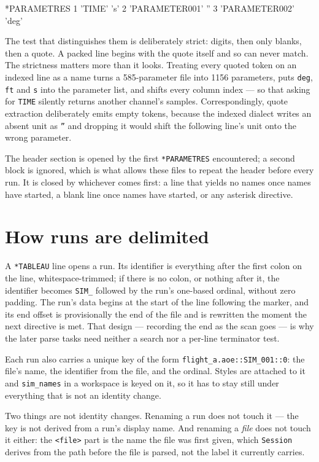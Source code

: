\documentclass[11pt,a4paper,oneside]{report}
\newcommand{\code}[1]{\texttt{#1}}
\begin{document}
\begin{aoecode}
*PARAMETRES
      1 'TIME' 's'
      2 'PARAMETER001'  ''
      3 'PARAMETER002'  'deg'
\end{aoecode}

The test that distinguishes them is deliberately strict: digits, then only
blanks, then a quote. A packed line begins with the quote itself and so can never
match. The strictness matters more than it looks. Treating every quoted token on
an indexed line as a name turns a 585-parameter file into 1156 parameters, puts
\code{deg}, \code{ft} and \code{s} into the parameter list, and shifts every
column index --- so that asking for \code{TIME} silently returns another
channel's samples. Correspondingly, quote extraction deliberately emits empty
tokens, because the indexed dialect writes an absent unit as \code{''} and
dropping it would shift the following line's unit onto the wrong parameter.

The header section is opened by the first \code{*PARAMETRES} encountered; a
second block is ignored, which is what allows these files to repeat the header
before every run. It is closed by whichever comes first: a line that yields no
names once names have started, a blank line once names have started, or any
asterisk directive.

\section{How runs are delimited}

A \code{*TABLEAU} line opens a run. Its identifier is everything after the first
colon on the line, whitespace-trimmed; if there is no colon, or nothing after it,
the identifier becomes \code{SIM\_} followed by the run's one-based ordinal,
without zero padding. The run's data begins at the start of the line following
the marker, and its end offset is provisionally the end of the file and is
rewritten the moment the next directive is met. That design --- recording the end
as the scan goes --- is why the later parse tasks need neither a search nor a
per-line terminator test.

Each run also carries a unique key of the form
\code{flight\_a.aoe::SIM\_001::0}: the file's name, the identifier from the
file, and the ordinal. Styles are attached to it and \code{sim\_names} in a
workspace is keyed on it, so it has to stay still under everything that is not
an identity change.

Two things are not identity changes. Renaming a run does not touch it --- the
key is not derived from a run's display name. And renaming a \emph{file} does
not touch it either: the \code{<file>} part is the name the file was first
given, which \code{Session} derives from the path before the file is parsed,
not the label it currently carries.
\end{document}
